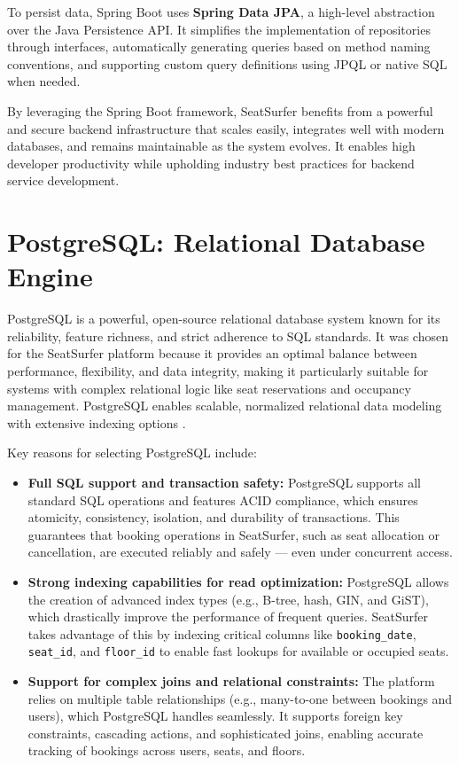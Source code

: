 \documentclass[12pt,a4paper]{report} %
\begin{document}
To persist data, Spring Boot uses \textbf{Spring Data JPA}, a high-level abstraction over the Java Persistence API. It simplifies the implementation of repositories through interfaces, automatically generating queries based on method naming conventions, and supporting custom query definitions using JPQL or native SQL when needed.

By leveraging the Spring Boot framework, SeatSurfer benefits from a powerful and secure backend infrastructure that scales easily, integrates well with modern databases, and remains maintainable as the system evolves. It enables high developer productivity while upholding industry best practices for backend service development.

\section{PostgreSQL: Relational Database Engine}

PostgreSQL is a powerful, open-source relational database system known for its reliability, feature richness, and strict adherence to SQL standards. It was chosen for the SeatSurfer platform because it provides an optimal balance between performance, flexibility, and data integrity, making it particularly suitable for systems with complex relational logic like seat reservations and occupancy management. PostgreSQL enables scalable, normalized relational data modeling with extensive indexing options \cite{postgresql2023docs}.

Key reasons for selecting PostgreSQL include:

\begin{itemize}
\item \textbf{Full SQL support and transaction safety:} PostgreSQL supports all standard SQL operations and features ACID compliance, which ensures atomicity, consistency, isolation, and durability of transactions. This guarantees that booking operations in SeatSurfer, such as seat allocation or cancellation, are executed reliably and safely — even under concurrent access.
\item \textbf{Strong indexing capabilities for read optimization:} PostgreSQL allows the creation of advanced index types (e.g., B-tree, hash, GIN, and GiST), which drastically improve the performance of frequent queries. SeatSurfer takes advantage of this by indexing critical columns like \texttt{booking\_date}, \texttt{seat\_id}, and \texttt{floor\_id} to enable fast lookups for available or occupied seats.
\item \textbf{Support for complex joins and relational constraints:} The platform relies on multiple table relationships (e.g., many-to-one between bookings and users), which PostgreSQL handles seamlessly. It supports foreign key constraints, cascading actions, and sophisticated joins, enabling accurate tracking of bookings across users, seats, and floors.
\end{itemize}
\end{document}
